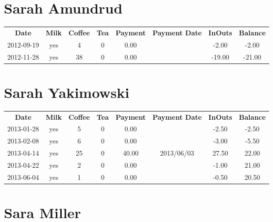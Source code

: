 \section{Sarah Amundrud}

\begin{center}
\begin{tabular}{cccccccc}
\textbf{Date} & \textbf{Milk} & \textbf{Coffee} & \textbf{Tea} & \textbf{Payment} & \textbf{Payment Date} & \textbf{InOuts} & \textbf{Balance} \\
2012-09-19 & yes &  4 & 0 & 0.00 &  &  -2.00 &  -2.00\\ 
2012-11-28 & yes & 38 & 0 & 0.00 &  & -19.00 & -21.00
\end{tabular}
\end{center}

\section{Sarah Yakimowski}

\begin{center}
\begin{tabular}{cccccccc}
\textbf{Date} & \textbf{Milk} & \textbf{Coffee} & \textbf{Tea} & \textbf{Payment} & \textbf{Payment Date} & \textbf{InOuts} & \textbf{Balance} \\
2013-01-28 & yes &  5 & 0 &  0.00 &  & -2.50 & -2.50\\ 
2013-02-08 & yes &  6 & 0 &  0.00 &  & -3.00 & -5.50\\ 
2013-04-14 & yes & 25 & 0 & 40.00 & 2013/06/03 & 27.50 & 22.00\\ 
2013-04-22 & yes &  2 & 0 &  0.00 &  & -1.00 & 21.00\\ 
2013-06-04 & yes &  1 & 0 &  0.00 &  & -0.50 & 20.50
\end{tabular}
\end{center}

\section{Sara Miller}

